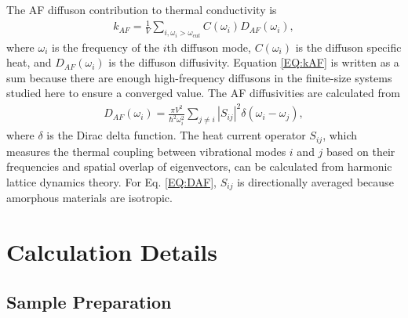 The AF diffuson contribution to thermal conductivity is
\cite{feldman_thermal_1993,feldman_numerical_1999}
\begin{equation}\label{EQ:kAF}
\begin{split}
k_{AF} = \frac{1}{V}\sum_{i,\omega_i>\omega_{cut}} 
C(\omega_i) D_{AF}(\omega_i), 
\end{split}
\end{equation}
where $\omega_i$ is the frequency of the $i$th diffuson mode, 
$C(\omega_i)$ is the diffuson specific heat, and $D_{AF}(\omega_i)$ 
is the diffuson diffusivity. Equation \eqref{EQ:kAF} is written as a 
sum because there are enough high-frequency diffusons in the 
finite-size systems studied here to ensure a converged 
value.\cite{feldman_thermal_1993,feldman_numerical_1999} 
The AF diffusivities are calculated from\cite{allen_thermal_1993} 
\begin{equation}\label{EQ:DAF}
\begin{split}
D_{AF}(\omega_i) = \frac{\pi V^2}{\hbar^2\omega^2_i}\sum_{j\neq i}
|S_{ij}|^2 \delta(\omega_i - \omega_j),
\end{split}
\end{equation}
where $\delta$ is the Dirac delta 
function.\cite{mfp_fn1} 
The heat current operator $S_{ij}$, which measures the thermal coupling 
between vibrational modes $i$ and $j$ based on their frequencies and 
spatial overlap of eigenvectors, 
can be calculated from harmonic lattice dynamics theory.
\cite{allen_thermal_1993,feldman_thermal_1993,feldman_numerical_1999} 
For Eq. \eqref{EQ:DAF}, $S_{ij}$ is directionally averaged because 
amorphous materials are isotropic. 

\section{\label{S:Calculation}Calculation Details}

\subsection{\label{S:Sample}Sample Preparation}

